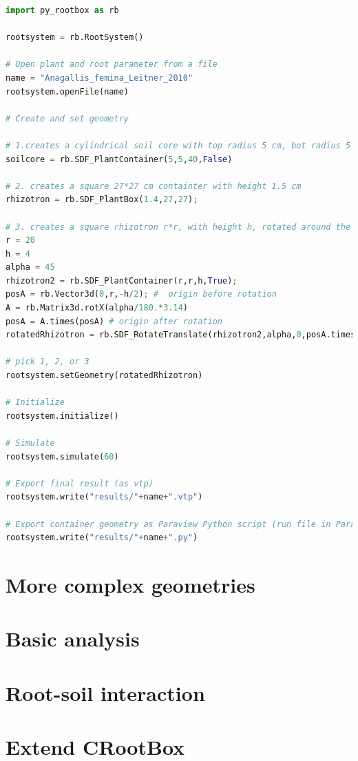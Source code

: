 \documentclass[a4paper]{article}
\begin{document}
\begin{lstlisting}[language=Python, caption=Example 1b]
import py_rootbox as rb

rootsystem = rb.RootSystem()

# Open plant and root parameter from a file
name = "Anagallis_femina_Leitner_2010" 
rootsystem.openFile(name)

# Create and set geometry

# 1.creates a cylindrical soil core with top radius 5 cm, bot radius 5 cm, height 40cm
soilcore = rb.SDF_PlantContainer(5,5,40,False)

# 2. creates a square 27*27 cm containter with height 1.5 cm
rhizotron = rb.SDF_PlantBox(1.4,27,27);

# 3. creates a square rhizotron r*r, with height h, rotated around the x-axis for angle alpha
r = 20
h = 4
alpha = 45
rhizotron2 = rb.SDF_PlantContainer(r,r,h,True);
posA = rb.Vector3d(0,r,-h/2); #  origin before rotation
A = rb.Matrix3d.rotX(alpha/180.*3.14)
posA = A.times(posA) # origin after rotation
rotatedRhizotron = rb.SDF_RotateTranslate(rhizotron2,alpha,0,posA.times(-1));

# pick 1, 2, or 3
rootsystem.setGeometry(rotatedRhizotron) 

# Initialize
rootsystem.initialize() 

# Simulate
rootsystem.simulate(60)

# Export final result (as vtp)
rootsystem.write("results/"+name+".vtp") 

# Export container geometry as Paraview Python script (run file in Paraview by Tools->Python Shell, Run Script)    
rootsystem.write("results/"+name+".py") 

\end{lstlisting}









 
\section*{More complex geometries}




\section*{Basic analysis}




\section*{Root-soil interaction}





\section*{Extend CRootBox}







\end{document}
